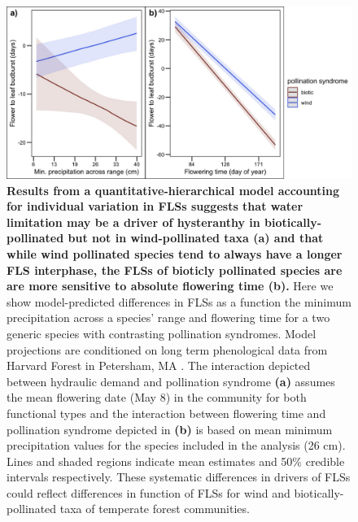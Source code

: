 \documentclass[11pt]{article}
\begin{document}
 \begin{figure}[H] 
       \centering
          \includegraphics[height=0.4\textheight]{..//..//apcs.jpeg}
          \caption{\textbf{Results from a quantitative-hierarchical model accounting for individual variation in FLSs suggests that water limitation may be a driver of hysteranthy in biotically-pollinated but not in wind-pollinated taxa (a)  and that while wind pollinated species tend to always have a longer FLS interphase, the FLSs of bioticly pollinated species are are more sensitive to absolute flowering time (b).} Here we show model-predicted differences in FLSs as a function the minimum precipitation across a species' range and flowering time for a two generic species with contrasting pollination syndromes. Model projections are conditioned on long term phenological data from Harvard Forest in Petersham, MA \citep{OKeefe2015}. The interaction depicted between hydraulic demand and pollination syndrome \textbf{(a)} assumes the mean flowering date (May 8) in the community for both functional types and the interaction between flowering time and pollination syndrome depicted in \textbf{(b)} is based on mean minimum precipitation values for the species included in the analysis (26 cm). Lines and shaded regions indicate mean estimates and 50\% credible intervals respectively. These systematic differences in drivers of FLSs could reflect differences in function of FLSs for wind and biotically-pollinated taxa of temperate forest communities.}
       \label{fig:apcs}
    \end{figure}
    
\end{document}
